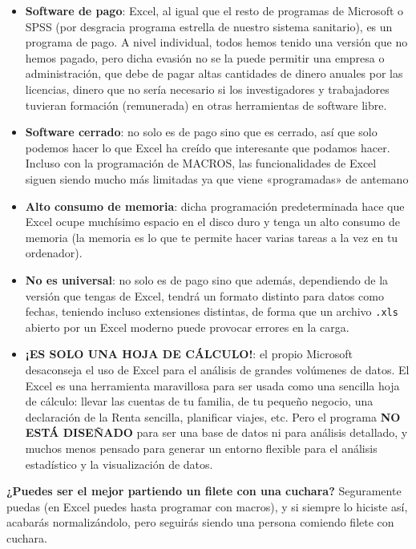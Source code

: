 \documentclass[11pt,]{book}
\begin{document}
\begin{itemize}
\item
  \textbf{Software de pago}: Excel, al igual que el resto de programas de Microsoft o SPSS (por desgracia programa estrella de nuestro sistema sanitario), es un programa de pago. A nivel individual, todos hemos tenido una versión que no hemos pagado, pero dicha evasión no se la puede permitir una empresa o administración, que debe de pagar altas cantidades de dinero anuales por las licencias, dinero que no sería necesario si los investigadores y trabajadores tuvieran formación (remunerada) en otras herramientas de software libre.
\item
  \textbf{Software cerrado}: no solo es de pago sino que es cerrado, así que solo podemos hacer lo que Excel ha creído que interesante que podamos hacer. Incluso con la programación de MACROS, las funcionalidades de Excel siguen siendo mucho más limitadas ya que viene «programadas» de antemano
\item
  \textbf{Alto consumo de memoria}: dicha programación predeterminada hace que Excel ocupe muchísimo espacio en el disco duro y tenga un alto consumo de memoria (la memoria es lo que te permite hacer varias tareas a la vez en tu ordenador).
\item
  \textbf{No es universal}: no solo es de pago sino que además, dependiendo de la versión que tengas de Excel, tendrá un formato distinto para datos como fechas, teniendo incluso extensiones distintas, de forma que un archivo \texttt{.xls} abierto por un Excel moderno puede provocar errores en la carga.
\item
  \textbf{¡ES SOLO UNA HOJA DE CÁLCULO!}: el propio Microsoft desaconseja el uso de Excel para el análisis de grandes volúmenes de datos. El Excel es una herramienta maravillosa para ser usada como una sencilla hoja de cálculo: llevar las cuentas de tu familia, de tu pequeño negocio, una declaración de la Renta sencilla, planificar viajes, etc. Pero el programa \textbf{NO ESTÁ DISEÑADO} para ser una base de datos ni para análisis detallado, y muchos menos pensado para generar un entorno flexible para el análisis estadístico y la visualización de datos.
\end{itemize}

\textbf{¿Puedes ser el mejor partiendo un filete con una cuchara?} Seguramente puedas (en Excel puedes hasta programar con macros), y si siempre lo hiciste así, acabarás normalizándolo, pero seguirás siendo una persona comiendo filete con cuchara.
\end{document}
